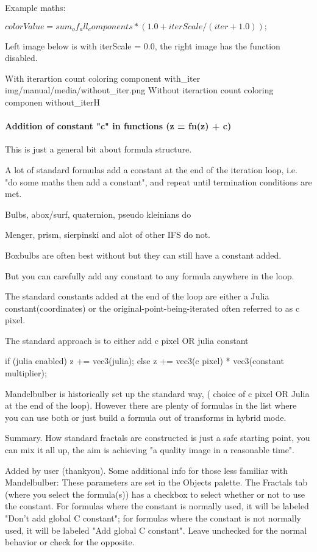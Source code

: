 Example maths:

$colorValue =  sum_of_all_components *  ( 1.0 + iterScale / ( iter + 1.0));$

Left image below is with iterScale = 0.0, the right image has the function disabled.

{With iterartion count coloring component}
{with_iter}
{img/manual/media/without_iter.png}
{Without iterartion count coloring componen}
{without_iter}{H}


\paragraph{Addition of constant "c" in functions (z = fn(z) + c)}
This is just a general bit about formula structure.

A lot of standard formulas add a constant at the end of the iteration loop, i.e. "do some maths then add a constant", and repeat until termination conditions are met.

Bulbs, abox/surf, quaternion, pseudo kleinians do

Menger, prism, sierpinski and alot of other IFS do not.

Boxbulbs are often best without but they can still have a constant added.

But you can carefully add any constant to any formula anywhere in the loop.

The standard constants added at the end of the loop are either a Julia constant(coordinates) or the original-point-being-iterated often referred to as c pixel.

The standard approach is to either add c pixel OR julia constant

if (julia enabled) z += vec3(julia);
else z += vec3(c pixel) * vec3(constant multiplier);

Mandelbulber is historically set up the standard way, ( choice of c pixel OR Julia at the end of the loop).
However there are plenty of formulas in the list where you can use both or just build a formula out of transforms in hybrid mode.

Summary. How standard fractals are constructed is just a safe starting point, you can mix it all up, the aim is achieving "a quality image in a reasonable time".


Added by user (thankyou).
 Some additional info for those less familiar with Mandelbulber: These parameters are set in the Objects palette. The Fractals tab (where you select the formula(s)) has a checkbox to select whether or not to use the constant. For formulas where the constant is normally used, it will be labeled "Don't add global C constant"; for formulas where the constant is not normally used, it will be labeled "Add global C constant". Leave unchecked for the normal behavior or check for the opposite.

